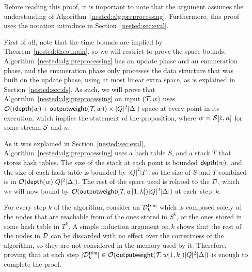 Before reading this proof, it is important to note that the argument assumes the understanding of Algorithm~\ref{nested:alg:preprocessing}. Furthermore, this proof uses the notation introduce in Section~\ref{nested:sec:eval}.

First of all, note that the time bounds are implied by Theorem~\ref{nested:theo:main}, so we will restrict to prove the space bounds. 
Algorithm~\ref{nested:alg:preprocessing} has an update phase and an enumeration phase, and the enumeration phase only processes the data structure that was built on the update phase, using at most linear extra space, as is explained in Section~\ref{nested:sec:ds}. As such, we will prove that Algorithm~\ref{nested:alg:preprocessing} on input $(\mathcal{T}\!, w)$ uses $\mathcal{O}((\mathsf{depth}(w) + \mathsf{outputweight}(\mathcal{T}\!,w))\times|Q|^2|\Delta|)$ space at every point in its execution, which implies the statement of the proposition, where $w = \mathcal{S}[1,n]$ for some stream $\mathcal{S}$ and $n$.

As it was explained in Section~\ref{nested:sec:eval}, Algorithm~\ref{nested:alg:preprocessing} uses a hash table $S$, and a stack $T$ that stores hash tables. The size of the stack at each point is bounded $\mathsf{depth}(w)$, and the size of each hash table is bounded by $|Q|^2|\Gamma|$, so the size of $S$ and $T$ combined is in $\mathcal{O}(\mathsf{depth}(w)|Q|^2|\Delta|)$. The rest of the space used is related to the \dsepsabbr $\mathcal{D}$, which we will now bound by $\mathcal{O}(\mathsf{outputweight}(\mathcal{T}\!,w[1,k])|Q|^2|\Delta|)$ at each~step~$k$.

For every step $k$ of the algorithm, consider an \dsepsabbr $\mathcal{D}^{\textsf{trim}}_k$ which is composed solely of the nodes that are reachable from of the ones stored in $S^k$, or the ones stored in some hash table in $T^k$. A simple induction argument on $k$ shows that the rest of the nodes in $\mathcal{D}$ can be discarded with no effect over the correctness of the algorithm, so they are not considered in the memory used by it. Therefore, proving that at each step $| \mathcal{D}^{\textsf{trim}}_k | \in \mathcal{O}(\mathsf{outputweight}(\mathcal{T}\!,w[1,k])|Q|^2|\Delta|)$ is enough to complete the proof. 


